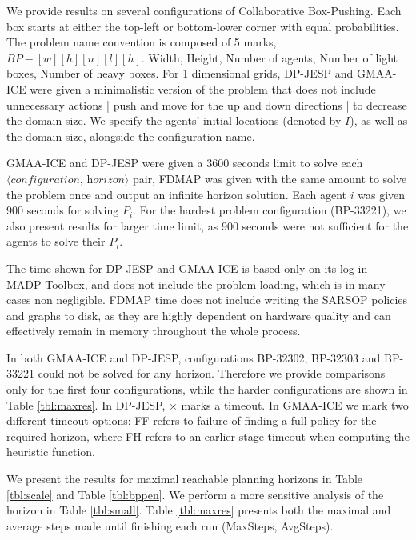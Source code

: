 \documentclass[letterpaper]{article} %
\theoremstyle{definition}
\newcommand{\cbp}[0]{Collaborative Box-Pushing}
\begin{document}
We provide results on several configurations of \cbp. Each box starts at either the top-left or bottom-lower corner with equal probabilities. The problem name convention is composed of 5 marks, $\textit{BP}-[w][h][n][l][h]$.
Width, Height, Number of agents, Number of light boxes, Number of heavy boxes. For 1 dimensional grids, DP-JESP and GMAA-ICE were given a minimalistic version of the problem that does not include unnecessary actions | push and move for the up and down directions | to decrease the domain size. We specify the agents' initial locations (denoted by $I$), as well as the domain size, alongside the configuration name.

GMAA-ICE and DP-JESP were given a 3600 seconds limit to solve each $\langle\textit{configuration, horizon}\rangle$ pair, FDMAP was given with the same amount to solve the problem once and output an infinite horizon solution. Each agent $i$ was given 900 seconds for  solving $P_i$. For the hardest problem configuration (BP-33221), we also present results for larger time limit, as 900 seconds were not sufficient for the agents to solve their $P_i$.

The time shown for DP-JESP and GMAA-ICE is based only on its log in MADP-Toolbox, and does not include the problem loading, which is in many cases non negligible. FDMAP time does not include writing the SARSOP policies and graphs to disk, as they are highly dependent on hardware quality and can effectively remain in memory throughout the whole process.

In both GMAA-ICE and DP-JESP, configurations BP-32302, BP-32303 and BP-33221 could not be solved for any horizon. Therefore we provide comparisons only for the first four configurations, while the harder configurations are shown in Table \ref{tbl:maxres}.
In DP-JESP, $\times$ marks a timeout. In GMAA-ICE we mark two different timeout options: FF refers to failure of finding a full policy for the required horizon, where FH refers to an earlier stage timeout when computing the heuristic function.

We present the results for maximal reachable planning horizons in Table \ref{tbl:scale} and Table \ref{tbl:bppen}. We perform a more sensitive analysis of the horizon in Table \ref{tbl:small}. Table \ref{tbl:maxres} presents both the maximal and average steps made until finishing each run (MaxSteps, AvgSteps).
\end{document}
